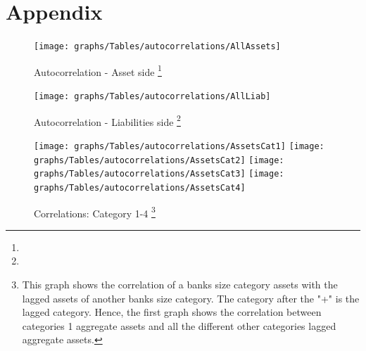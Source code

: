 \documentclass[12pt, a4paper]{article} %
\begin{document}

\newpage
\printbibliography[
heading=bibintoc,
title={Bibliography}
]

\newpage




\appendix
\section{Appendix}

\begin{figure}[hbtp]
\begin{minipage}{\textwidth}

\centering
\caption[1]{Autocorrelation - Asset side \footnote{} }
\texttt{[image: graphs/Tables/autocorrelations/AllAssets]}
\label{fig:autocorrelation_asset_side}

\end{minipage}
\end{figure}

\begin{figure}[hbtp]
\begin{minipage}{\textwidth}

\centering
\caption[1]{Autocorrelation - Liabilities side \footnote{} }
\texttt{[image: graphs/Tables/autocorrelations/AllLiab]}
\label{fig:autocorrelation_liab_side}

\end{minipage}
\end{figure}




\begin{figure}[hbtp]
\begin{minipage}{\textwidth}
\centering
\caption[1]{Correlations: Category 1-4 \footnote{This graph shows the correlation of a banks size category assets with the lagged assets of another banks size category. The category after the "+" is the lagged category. Hence, the first graph shows the correlation between categories 1 aggregate assets and all the different other categories lagged aggregate assets.}}
\texttt{[image: graphs/Tables/autocorrelations/AssetsCat1]}
\texttt{[image: graphs/Tables/autocorrelations/AssetsCat2]}
\texttt{[image: graphs/Tables/autocorrelations/AssetsCat3]}
\texttt{[image: graphs/Tables/autocorrelations/AssetsCat4]}
\label{autocorrelationsCat14}
\end{minipage}
\end{figure}
\end{document}
